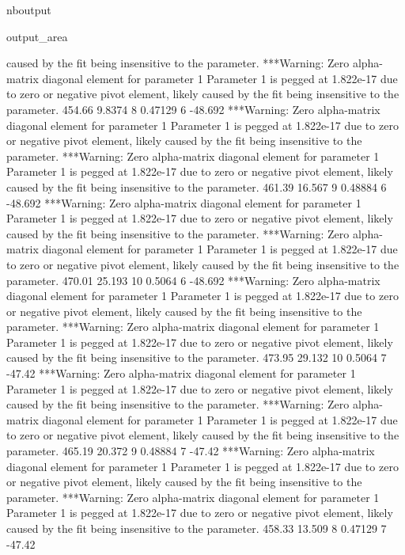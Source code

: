 \documentclass[letterpaper,10pt,english]{sphinxmanual}
\begin{document}
\begin{sphinxuseclass}{nboutput}
{\begin{sphinxuseclass}{output_area}
\begin{sphinxuseclass}{}
\begin{sphinxVerbatim}[commandchars=\\\{\}]
 caused by the fit being insensitive to the parameter.
***Warning: Zero alpha-matrix diagonal element for parameter 1
 Parameter 1 is pegged at 1.822e-17 due to zero or negative pivot element, likely
 caused by the fit being insensitive to the parameter.
          454.66      9.8374    8     0.47129    6     -48.692
***Warning: Zero alpha-matrix diagonal element for parameter 1
 Parameter 1 is pegged at 1.822e-17 due to zero or negative pivot element, likely
 caused by the fit being insensitive to the parameter.
***Warning: Zero alpha-matrix diagonal element for parameter 1
 Parameter 1 is pegged at 1.822e-17 due to zero or negative pivot element, likely
 caused by the fit being insensitive to the parameter.
          461.39      16.567    9     0.48884    6     -48.692
***Warning: Zero alpha-matrix diagonal element for parameter 1
 Parameter 1 is pegged at 1.822e-17 due to zero or negative pivot element, likely
 caused by the fit being insensitive to the parameter.
***Warning: Zero alpha-matrix diagonal element for parameter 1
 Parameter 1 is pegged at 1.822e-17 due to zero or negative pivot element, likely
 caused by the fit being insensitive to the parameter.
          470.01      25.193   10      0.5064    6     -48.692
***Warning: Zero alpha-matrix diagonal element for parameter 1
 Parameter 1 is pegged at 1.822e-17 due to zero or negative pivot element, likely
 caused by the fit being insensitive to the parameter.
***Warning: Zero alpha-matrix diagonal element for parameter 1
 Parameter 1 is pegged at 1.822e-17 due to zero or negative pivot element, likely
 caused by the fit being insensitive to the parameter.
          473.95      29.132   10      0.5064    7      -47.42
***Warning: Zero alpha-matrix diagonal element for parameter 1
 Parameter 1 is pegged at 1.822e-17 due to zero or negative pivot element, likely
 caused by the fit being insensitive to the parameter.
***Warning: Zero alpha-matrix diagonal element for parameter 1
 Parameter 1 is pegged at 1.822e-17 due to zero or negative pivot element, likely
 caused by the fit being insensitive to the parameter.
          465.19      20.372    9     0.48884    7      -47.42
***Warning: Zero alpha-matrix diagonal element for parameter 1
 Parameter 1 is pegged at 1.822e-17 due to zero or negative pivot element, likely
 caused by the fit being insensitive to the parameter.
***Warning: Zero alpha-matrix diagonal element for parameter 1
 Parameter 1 is pegged at 1.822e-17 due to zero or negative pivot element, likely
 caused by the fit being insensitive to the parameter.
          458.33      13.509    8     0.47129    7      -47.42

\end{sphinxVerbatim}
\end{sphinxuseclass}
\end{sphinxuseclass}}
\end{sphinxuseclass}
\end{document}
